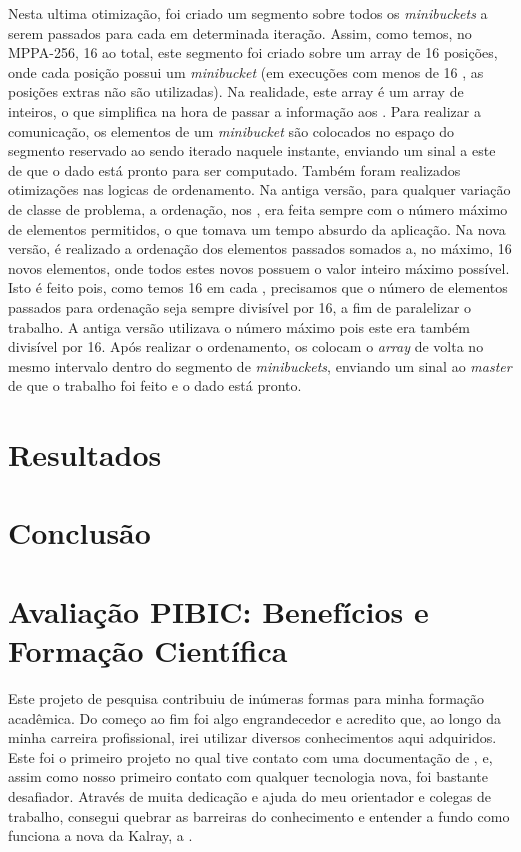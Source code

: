 \documentclass[a4paper,11pt]{article}
\newcommand{\mppa}{MPPA-256\xspace}
\begin{document}
Nesta ultima otimização, foi criado um segmento sobre todos os \textit{minibuckets} a serem passados para cada \cc em determinada iteração. Assim, como temos, no \mppa, 16 \ccs ao total, este segmento foi criado sobre um array de 16 posições, onde cada posição possui um \textit{minibucket} (em execuções com menos de 16 \ccs, as posições extras não são utilizadas). Na realidade, este array é um array de inteiros, o que simplifica na hora de passar a informação aos \ccs. Para realizar a comunicação, os elementos de um \textit{minibucket} são colocados no espaço do segmento reservado ao \cc sendo iterado naquele instante, enviando um sinal a este \cc de que o dado está pronto para ser computado. Também foram realizados otimizações nas logicas de ordenamento. Na antiga versão, para qualquer variação de classe de problema, a ordenação, nos \ccs, era feita sempre com o número máximo de elementos permitidos, o que tomava um tempo absurdo da aplicação. Na nova versão, é realizado a ordenação dos elementos passados somados a, no máximo, 16 novos elementos, onde todos estes novos possuem o valor inteiro máximo possível. Isto é feito pois, como temos 16 \pes em cada \cc, precisamos que o número de elementos passados para ordenação seja sempre divisível por 16, a fim de paralelizar o trabalho. A antiga versão utilizava o número máximo pois este era também divisível por 16. Após realizar o ordenamento, os \ccs colocam o \textit{array} de volta no mesmo intervalo dentro do segmento de \textit{minibuckets}, enviando um sinal ao \textit{master} de que o trabalho foi feito e o dado está pronto.

\section{Resultados}
\label{sec:resultados}

\section{Conclusão}
\label{sec:conclusao}



\section{Avaliação PIBIC: Benefícios e Formação Científica}

Este projeto de pesquisa contribuiu de inúmeras formas para minha formação acadêmica. Do começo ao fim foi algo engrandecedor e acredito que, ao longo da minha carreira profissional, irei utilizar diversos conhecimentos aqui adquiridos. Este foi o primeiro projeto no qual tive contato com uma documentação de \api, e, assim como nosso primeiro contato com qualquer tecnologia nova, foi bastante desafiador. Através de muita dedicação e ajuda do meu orientador e colegas de trabalho, consegui quebrar as barreiras do conhecimento e entender a fundo como funciona a nova \api da Kalray, a \async.  
\end{document}

